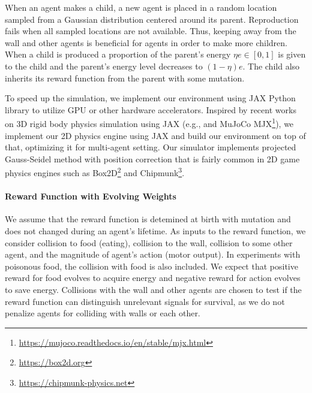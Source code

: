 When an agent makes a child, a new agent is placed in a random location sampled from a Gaussian distribution centered around its parent. %
Reproduction fails when all
sampled locations are not available. Thus, keeping away from the wall and other agents is beneficial for agents in order to make more children. When a child is produced
a proportion of the parent's energy $\eta e \in [0, 1]$ is given to the child and the parent's energy level decreases to $(1-\eta)e$.
The child also inherits its reward function from the parent with some mutation.

To speed up the simulation, we implement our environment using JAX Python library \citep{jax2018github} to utilize GPU or other hardware accelerators. Inspired by recent works on 3D rigid body physics simulation using JAX (e.g., \citet{brax2021github} and MuJoCo \citep{todorov2012mujoco} MJX\footnote{\url{https://mujoco.readthedocs.io/en/stable/mjx.html}}), we implement our 2D physics engine using JAX and build our environment on top of that, optimizing it for multi-agent setting. Our simulator implements projected Gauss-Seidel method with position correction \citep{catto2005iterative} that is fairly common in 2D game physics engines such as Box2D\footnote{\url{https://box2d.org}} and Chipmunk\footnote{\url{https://chipmunk-physics.net}}.

\paragraph{Reward Function with Evolving Weights} %
We assume that the reward function is detemined at birth with mutation and does not changed during an agent's lifetime. As inputs to the reward function, we consider  collision to food (eating),  collision to the wall,  collision to some other agent, and  the magnitude of agent's action (motor output). In experiments with poisonous food, the collision with food is also included.
We expect that positive reward for food evolves to acquire energy
and negative reward for action  evolves to save energy. Collisions with the wall and other agents are chosen to test if the reward function can distinguish unrelevant signals for survival, as we do not penalize agents for colliding with walls or each other.

